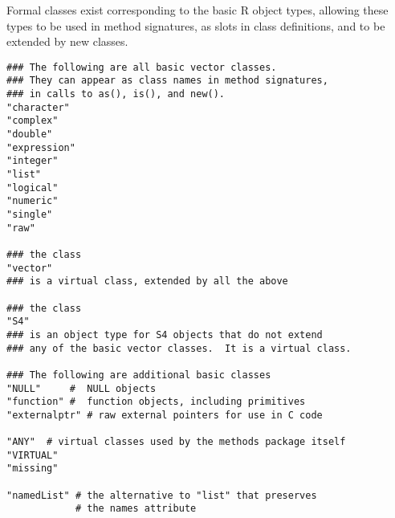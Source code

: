 %
\begin{Description}\relax
Formal classes exist corresponding to the basic R object types, allowing
these types to be used in method signatures, as slots in class
definitions, and to be extended by new classes.
\end{Description}
%
\begin{Usage}
\begin{verbatim}
### The following are all basic vector classes.
### They can appear as class names in method signatures,
### in calls to as(), is(), and new().
"character"
"complex"
"double"
"expression"
"integer"
"list"
"logical"
"numeric"
"single"
"raw"

### the class
"vector"
### is a virtual class, extended by all the above

### the class
"S4"
### is an object type for S4 objects that do not extend
### any of the basic vector classes.  It is a virtual class.

### The following are additional basic classes
"NULL"     #  NULL objects
"function" #  function objects, including primitives
"externalptr" # raw external pointers for use in C code

"ANY"  # virtual classes used by the methods package itself
"VIRTUAL"
"missing"

"namedList" # the alternative to "list" that preserves
            # the names attribute
\end{verbatim}
\end{Usage}
